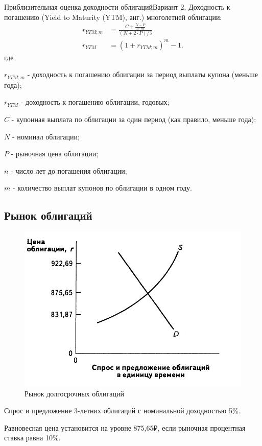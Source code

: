 \documentclass[_DKB_p1_Money.tex]{subfiles}
\begin{document}
\begin{frame}[shrink=20]{Приблизительная оценка доходности облигаций}{Вариант 2.}
Доходность к погашению (Yield to Maturity (YTM), анг.) многолетней облигации:
\begin{align}
r_{YTM;m}&=\frac{C+\frac{N-P}{n\cdot m}}{(N + 2 \cdot P)/3}\\
r_{YTM}&=(1+r_{YTM;m})^m-1.
\end{align}
где

$r_{YTM;m}$ - доходность к погашению облигации за период выплаты купона (меньше года);

$r_{YTM}$ - доходность к погашению облигации, годовых;

$C$ - купонная выплата по облигации за один период (как правило, меньше года);

$N$ - номинал облигации;

$P$ - рыночная цена облигации;

$n$ - число лет до погашения облигации;

$m$ - количество выплат купонов по облигации в одном году.

\end{frame}

\subsection{Рынок облигаций}
\begin{frame}
\begin{figure}
\center
\includegraphics[scale=0.3]{img/ir_obligations_3y5per}
\caption{Рынок долгосрочных облигаций}
\end{figure}

Спрос и предложение 3-летних облигаций с номинальной доходностью 5\%. 

Равновесная цена установится на уровне 875,65₽, если рыночная процентная ставка равна 10\%.

\end{frame}
\end{document}

